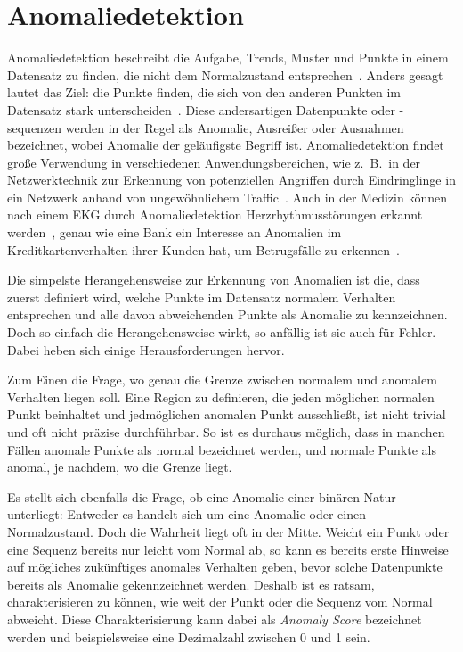 \chapter{Anomaliedetektion}\label{ch:anomaliedetektion}
Anomaliedetektion beschreibt die Aufgabe, Trends, Muster und Punkte in einem Datensatz zu finden, die nicht dem Normalzustand
entsprechen~\cite{Chandola2009}. Anders gesagt lautet das Ziel: die Punkte finden, die sich von den anderen Punkten im Datensatz
stark unterscheiden~\cite[Kap.~10]{Tan2014}. Diese andersartigen Datenpunkte oder -sequenzen werden in der Regel als Anomalie,
Ausreißer oder Ausnahmen bezeichnet, wobei Anomalie der geläufigste Begriff ist. Anomaliedetektion findet große Verwendung in
verschiedenen Anwendungsbereichen, wie z.~B.~in der Netzwerktechnik zur Erkennung von potenziellen Angriffen durch Eindringlinge
in ein Netzwerk anhand von ungewöhnlichem Traffic~\Cite{Bernacki2015}. Auch in der Medizin können nach einem EKG durch
Anomaliedetektion Herzrhythmusstörungen erkannt werden~\cite{Chauhan2015}, genau wie eine Bank ein Interesse an Anomalien im
Kreditkartenverhalten ihrer Kunden hat, um Betrugsfälle zu erkennen~\cite{Jiang2023, CeronmaniSharmila2019}.

Die simpelste Herangehensweise zur Erkennung von Anomalien ist die, dass zuerst definiert wird, welche Punkte im Datensatz normalem
Verhalten entsprechen und alle davon abweichenden Punkte als Anomalie zu kennzeichnen. Doch so einfach die Herangehensweise wirkt,
so anfällig ist sie auch für Fehler. Dabei heben sich einige Herausforderungen hervor.

Zum Einen die Frage, wo genau die Grenze zwischen normalem und anomalem Verhalten liegen soll. Eine Region zu definieren, die jeden 
möglichen normalen Punkt beinhaltet und jedmöglichen anomalen Punkt ausschließt, ist nicht trivial und oft nicht präzise durchführbar.
So ist es durchaus möglich, dass in manchen Fällen anomale Punkte als normal bezeichnet werden, und normale Punkte als anomal, je
nachdem, wo die Grenze liegt.

Es stellt sich ebenfalls die Frage, ob eine Anomalie einer binären Natur unterliegt: Entweder es handelt sich um eine Anomalie oder
einen Normalzustand. Doch die Wahrheit liegt oft in der Mitte. Weicht ein Punkt oder eine Sequenz bereits nur leicht vom Normal ab,
so kann es bereits erste Hinweise auf mögliches zukünftiges anomales Verhalten geben, bevor solche Datenpunkte bereits als Anomalie
gekennzeichnet werden. Deshalb ist es ratsam, charakterisieren zu können, wie weit der Punkt oder die Sequenz vom Normal abweicht.
Diese Charakterisierung kann dabei als \textit{Anomaly Score} bezeichnet werden und beispielsweise eine Dezimalzahl zwischen 0 und 1
sein.

